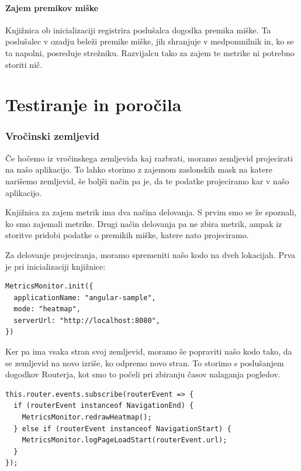 \documentclass[a4paper, 12pt]{book}
\begin{document}
\paragraph{Zajem premikov miške}

Knjižnica ob inicializaciji registrira poslušalca dogodka premika miške. Ta poslušalec v ozadju beleži premike miške, jih shranjuje v medpomnilnik in, ko se ta napolni, posreduje strežniku. Razvijalcu tako za zajem te metrike ni potrebno storiti nič.

\section{Testiranje in poročila}
\label{ch3:sec4}

\subsubsection{Vročinski zemljevid}

Če hočemo iz vročinskega zemljevida kaj razbrati, moramo zemljevid projecirati na našo aplikacijo. To lahko storimo z zajemom zaslonskih mask na katere narišemo zemljevid, še boljši način pa je, da te podatke projeciramo kar v našo aplikacijo.

Knjižnica za zajem metrik ima dva načina delovanja. S prvim smo se že spoznali, ko smo zajemali metrike. Drugi način delovanja pa ne zbira metrik, ampak iz storitve pridobi podatke o premikih miške, katere nato projeciramo.

Za delovanje projeciranja, moramo spremeniti našo kodo na dveh lokacijah. Prva je pri inicializaciji knjižnice:

\begin{lstlisting}[label=code:heatmap_init, caption=Sprememba načina delovanja knjižnice]
MetricsMonitor.init({
  applicationName: "angular-sample",
  mode: "heatmap",
  serverUrl: "http://localhost:8080",
})
\end{lstlisting}

Ker pa ima vsaka stran svoj zemljevid, moramo še popraviti našo kodo tako, da se zemljevid na novo izriše, ko odpremo novo stran. To storimo s poslušanjem dogodkov Routerja, kot smo to počeli pri zbiranju časov nalaganja pogledov.

\begin{lstlisting}[label=code:heatmap_redraw, caption=Sprememba zemljevida ob prehodu na novo stran]
this.router.events.subscribe(routerEvent => {
  if (routerEvent instanceof NavigationEnd) {
    MetricsMonitor.redrawHeatmap();
  } else if (routerEvent instanceof NavigationStart) {
    MetricsMonitor.logPageLoadStart(routerEvent.url);
  }	
});
\end{lstlisting}
\end{document}
